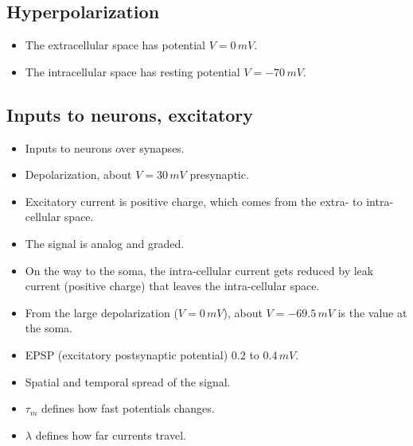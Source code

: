 \documentclass[a4paper, 12pt]{article}
\begin{document}
\subsection{Hyperpolarization}
\begin{itemize}[noitemsep,nolistsep]
	\item The extracellular space has potential $V=0\,mV$.
	\item The intracellular space has resting potential $V=-70\,mV$.
\end{itemize}

\subsection{Inputs to neurons, excitatory}
\begin{itemize}[noitemsep,nolistsep]
	\item Inputs to neurons over synapses.
	\item Depolarization, about $V=30\,mV$ presynaptic.
	\item Excitatory current is positive charge, which comes from the extra- to intra-cellular space.
	\item The signal is analog and graded.
	\item On the way to the soma, the intra-cellular current gets reduced by leak current (positive charge) that leaves the intra-cellular space.
	\item From the large depolarization ($V=0\,mV$), about $V=-69.5\,mV$ is the value at the soma.
	\item EPSP (excitatory postsynaptic potential) $0.2$ to $0.4\,mV$.
	\item Spatial and temporal spread of the signal.
	\item $\tau_m$ defines how fast potentials changes.
	\item $\lambda$ defines how far currents travel.
\end{itemize}
\begin{figure}[H]
	\centering
\end{figure}
\end{document}
